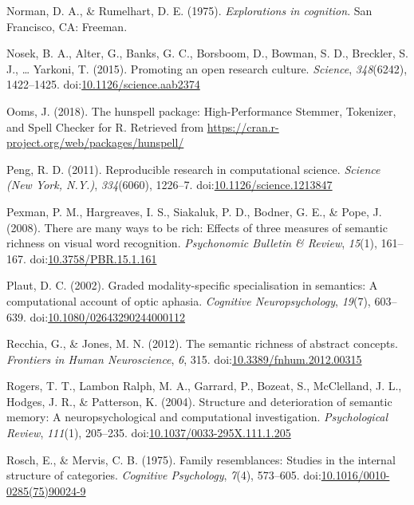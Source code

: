 \documentclass[man]{apa6}
\begin{document}
\leavevmode\hypertarget{ref-Norman1975}{}%
Norman, D. A., \& Rumelhart, D. E. (1975). \emph{Explorations in cognition}. San Francisco, CA: Freeman.

\leavevmode\hypertarget{ref-Nosek2015}{}%
Nosek, B. A., Alter, G., Banks, G. C., Borsboom, D., Bowman, S. D., Breckler, S. J., \ldots{} Yarkoni, T. (2015). Promoting an open research culture. \emph{Science}, \emph{348}(6242), 1422--1425. doi:\href{https://doi.org/10.1126/science.aab2374}{10.1126/science.aab2374}

\leavevmode\hypertarget{ref-Ooms2018}{}%
Ooms, J. (2018). The hunspell package: High-Performance Stemmer, Tokenizer, and Spell Checker for R. Retrieved from \url{https://cran.r-project.org/web/packages/hunspell/}

\leavevmode\hypertarget{ref-Peng2011}{}%
Peng, R. D. (2011). Reproducible research in computational science. \emph{Science (New York, N.Y.)}, \emph{334}(6060), 1226--7. doi:\href{https://doi.org/10.1126/science.1213847}{10.1126/science.1213847}

\leavevmode\hypertarget{ref-Pexman2008}{}%
Pexman, P. M., Hargreaves, I. S., Siakaluk, P. D., Bodner, G. E., \& Pope, J. (2008). There are many ways to be rich: Effects of three measures of semantic richness on visual word recognition. \emph{Psychonomic Bulletin \& Review}, \emph{15}(1), 161--167. doi:\href{https://doi.org/10.3758/PBR.15.1.161}{10.3758/PBR.15.1.161}

\leavevmode\hypertarget{ref-Plaut2002}{}%
Plaut, D. C. (2002). Graded modality-specific specialisation in semantics: A computational account of optic aphasia. \emph{Cognitive Neuropsychology}, \emph{19}(7), 603--639. doi:\href{https://doi.org/10.1080/02643290244000112}{10.1080/02643290244000112}

\leavevmode\hypertarget{ref-Recchia2012}{}%
Recchia, G., \& Jones, M. N. (2012). The semantic richness of abstract concepts. \emph{Frontiers in Human Neuroscience}, \emph{6}, 315. doi:\href{https://doi.org/10.3389/fnhum.2012.00315}{10.3389/fnhum.2012.00315}

\leavevmode\hypertarget{ref-Rogers2004}{}%
Rogers, T. T., Lambon Ralph, M. A., Garrard, P., Bozeat, S., McClelland, J. L., Hodges, J. R., \& Patterson, K. (2004). Structure and deterioration of semantic memory: A neuropsychological and computational investigation. \emph{Psychological Review}, \emph{111}(1), 205--235. doi:\href{https://doi.org/10.1037/0033-295X.111.1.205}{10.1037/0033-295X.111.1.205}

\leavevmode\hypertarget{ref-Rosch1975}{}%
Rosch, E., \& Mervis, C. B. (1975). Family resemblances: Studies in the internal structure of categories. \emph{Cognitive Psychology}, \emph{7}(4), 573--605. doi:\href{https://doi.org/10.1016/0010-0285(75)90024-9}{10.1016/0010-0285(75)90024-9}
\end{document}
